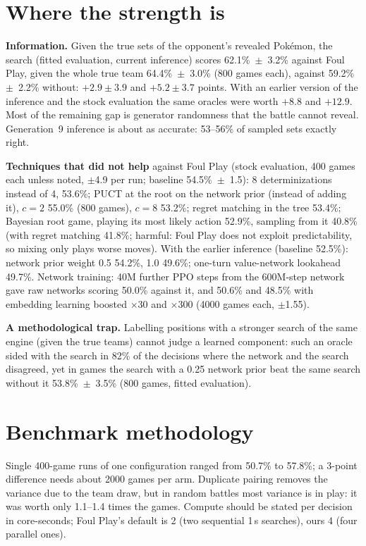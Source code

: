 \documentclass[conference]{IEEEtran}
\begin{document}
\section{Where the strength is}\label{sec:where}
\textbf{Information.} Given the true sets of the opponent's revealed Pok\'emon, the search (fitted evaluation,
current inference) scores 62.1\%~$\pm$~3.2\% against Foul Play, given the whole true team 64.4\%~$\pm$~3.0\%
(800 games each), against 59.2\%~$\pm$~2.2\% without: $+2.9\pm3.9$ and $+5.2\pm3.7$ points. With an earlier
version of the inference and the stock evaluation the same oracles were worth $+8.8$ and $+12.9$. Most of the
remaining gap is generator randomness that the battle cannot
reveal. Generation~9 inference is about as accurate: 53--56\% of sampled sets exactly right.

\textbf{Techniques that did not help} against Foul Play (stock evaluation, 400 games each unless noted, $\pm$4.9
per run; baseline 54.5\%~$\pm$~1.5): 8 determinizations instead of 4, 53.6\%; PUCT at the root on the network
prior (instead of adding it), $c{=}2$ 55.0\% (800 games), $c{=}8$ 53.2\%; regret matching in the tree 53.4\%;
Bayesian root game, playing its most likely action 52.9\%, sampling from it 40.8\% (with regret matching 41.8\%;
harmful: Foul Play does not exploit predictability, so mixing only plays worse moves). With the earlier inference
(baseline 52.5\%): network prior weight 0.5 54.2\%, 1.0 49.6\%; one-turn value-network lookahead 49.7\%.
Network training: 40M further PPO steps from the 600M-step network gave raw networks scoring 50.0\% against it,
and 50.6\% and 48.5\% with embedding learning boosted $\times30$ and $\times300$ (4000 games each, $\pm$1.55).

\textbf{A methodological trap.} Labelling positions with a stronger search of the same engine (given the true
teams) cannot judge a learned component: such an oracle sided with the search in 82\% of the decisions where the
network and the search disagreed, yet in games the search with a 0.25 network prior beat the same search without
it 53.8\%~$\pm$~3.5\% (800 games, fitted evaluation).

\section{Benchmark methodology}\label{sec:method}
Single 400-game runs of one configuration ranged from 50.7\% to 57.8\%; a 3-point difference needs about 2000
games per arm. Duplicate pairing removes the variance due to the team draw, but in random battles most variance is
in play: it was worth only 1.1--1.4 times the games. Compute should be stated per decision in core-seconds;
Foul Play's default is 2 (two sequential 1\,s searches), ours 4 (four parallel ones).
\end{document}
